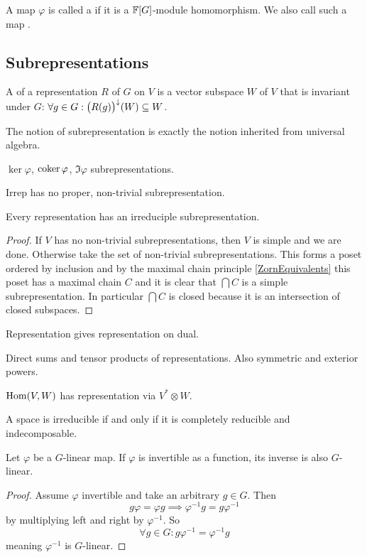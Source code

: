 \begin{definition}
A map $\varphi$ is called a  if it is a $\mathbb{F}[G]$-module homomorphism. We also call such a map .
\end{definition}

\subsection{Subrepresentations}
\begin{definition}
A  of a representation $R$ of $G$ on $V$ is a vector subspace $W$ of $V$ that is invariant under $G$: $\forall g\in G: \big(R(g)\big)^\downarrow(W) \subseteq W$.


\end{definition}
The notion of subrepresentation is exactly the notion inherited from universal algebra.



$\ker \varphi$, $\operatorname{coker} \varphi$, $\Im \varphi$ subrepresentations.

Irrep has no proper, non-trivial subrepresentation.

\begin{lemma} \label{existenceIrreps}
Every representation has an irreduciple subrepresentation.
\end{lemma}
\begin{proof}
If $V$ has no non-trivial subrepresentations, then $V$ is simple and we are done. 
Otherwise take the set of non-trivial subrepresentations. This forms a poset ordered by inclusion and by the maximal chain principle \ref{ZornEquivalents} this poset has a maximal chain $C$ and it is clear that $\bigcap C$ is a simple subrepresentation. In particular $\bigcap C$ is closed because it is an intersection of closed subspaces.
\end{proof}

Representation gives representation on dual.

Direct sums and tensor products of representations. Also symmetric and exterior powers.

$\operatorname{Hom}(V,W)$ has representation via $V^*\otimes W$.

A space is irreducible if and only if it is completely reducible and indecomposable.

\begin{proposition}
Let $\varphi$ be a $G$-linear map. If $\varphi$ is invertible as a function, its inverse is also $G$-linear.
\end{proposition}
\begin{proof}
Assume $\varphi$ invertible and take an arbitrary $g\in G$. Then
\[ g\varphi = \varphi g \implies \varphi^{-1} g = g \varphi^{-1} \]
by multiplying left and right by $\varphi^{-1}$. So
\[ \forall g\in G: g \varphi^{-1} = \varphi^{-1} g \]
meaning $\varphi^{-1}$ is $G$-linear.
\end{proof}

